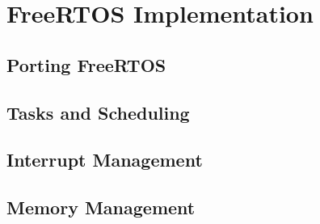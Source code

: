 \chapter{FreeRTOS Implementation}
\label{cha:rtos}

\lipsum[1]

\section{Porting FreeRTOS}
\label{sec:rtos_porting}

\lipsum[1]

\section{Tasks and Scheduling}
\label{sec:rtos_task}

\lipsum[1]

\section{Interrupt Management}
\label{sec:rtos_interrupts}

\lipsum[1]

\section{Memory Management}
\label{sec:rtos_memory}

\lipsum[1]